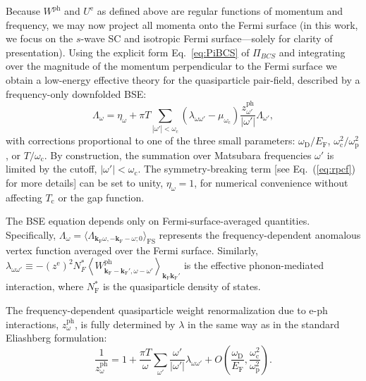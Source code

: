 \documentclass[%
 reprint,
superscriptaddress,
 amsmath,amssymb,
 aps,
prx,
]{revtex4-2}
\newcommand{\bk}{\mathbf{k}}
\newcommand{\txc}{\text{c}}
\newcommand{\txe}{\text{e}}
\newcommand{\txp}{\text{p}}
\newcommand{\txD}{\text{D}}
\newcommand{\txF}{\text{F}}
\newcommand{\txph}{\text{ph}}
\newcommand{\txFS}{\text{FS}}
\newcommand{\pcf}{\Lambda} %
\newcommand{\psp}{\mu} %
\begin{document}
Because
$W^{\txph}$ and $U^\txe$ as defined above are regular functions of momentum and frequency, we may now project all momenta onto the Fermi surface (in this work, we focus on the $s$-wave SC and isotropic Fermi surface---solely for clarity of presentation). Using the explicit form Eq.~\ref{eq:PiBCS}  of $\Pi_{BCS}$ and integrating over the magnitude of the momentum perpendicular to the Fermi surface we obtain a low-energy effective theory for the quasiparticle pair-field, described by a frequency-only downfolded BSE:
\begin{equation}
\label{eq:downfolded_BSE}
    \pcf_\omega=\eta_\omega+\pi T\sum_{|\omega'|<\omega_\txc}\left(\lambda_{\omega\omega'}-\psp_{\omega_\txc}\right) \frac{z^{\txph}_{\omega'}}{|\omega'|} \pcf_{\omega'},
\end{equation}
with corrections proportional to one of the three small parameters:
${\omega_\txD}/{E_\txF}$, ${\omega_\txc^2}/{\omega_\txp^2}$, or ${T}/{\omega_\txc}$.
By construction, the summation over Matsubara frequencies $\omega'$ is limited by the cutoff, $|\omega'|<\omega_\txc$. The symmetry-breaking 
term [see Eq.~(\ref{eq:rpcf}) for more details] can be set to unity,  $\eta_\omega = 1$,  for numerical convenience without affecting $T_\txc$ or the gap function. 

The BSE
equation depends only on Fermi-surface-averaged quantities. 
Specifically, $\pcf_\omega = \langle \pcf_{\bk_\txF\omega,-\bk_\txF-\omega; 0}\rangle_{\txFS}$ represents the frequency-dependent anomalous vertex function averaged over the Fermi surface. Similarly, 
$\lambda_{\omega\omega'}\equiv -\left(z^\txe\right)^2N_F^* \left<W^{\txph}_{\bk_\txF-\bk_\txF',\omega-\omega'} \right>_{\bk_\txF^{}\bk_\txF'}$ is the effective phonon-mediated interaction, where $N_\txF^*$ is the quasiparticle density of states. 

The frequency-dependent quasiparticle weight renormalization due to e-ph interactions, $z^{\txph}_{\omega}$, is  fully determined by $\lambda$ in the same way as in the standard Eliashberg formulation:
\begin{equation}
\label{eq:zph}
    \frac{1}{z^\txph_\omega}=1+\frac{\pi T}{\omega}\sum_{\omega'}\frac{\omega'}{|\omega'|}\lambda_{\omega\omega'}+O\left(\frac{\omega_\txD}{E_\txF}, \frac{\omega_\txc^2}{\omega_\txp^2}\right).
\end{equation}
\end{document}
